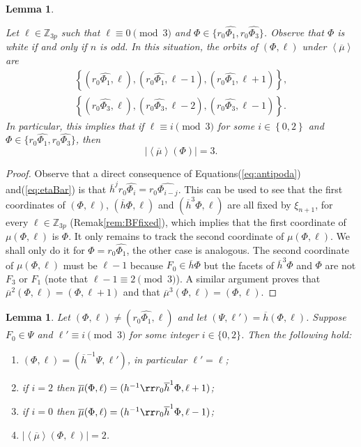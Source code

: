 \documentclass[final]{amsart}
\theoremstyle{plain}
\newtheorem{lemma}[thm]{Lemma}
\theoremstyle{definition}
\theoremstyle{remark}
\numberwithin{equation}{section}
\renewcommand{\{}{\lbrace}
\renewcommand{\}}{\rbrace}
\renewcommand{\bar}{\overline}
\renewcommand{\hat}{\widehat}
\newcommand{\bZ}{\mathbb{Z}}
\newcommand{\kng}{{h}}
\newcommand{\etab}{\bar{\kng}}
\newcommand{\mub}{\bar{\mu}}
\newcommand{\te}{\xi}
\begin{document}
\begin{lemma}\label{lem:chapulines0}


Let $\ell \in \bZ_{3p}$ such that $\ell \equiv 0 \pmod{3}$ and $\Phi \in \{r_{0}\hat{\Phi_{1}}, r_{0}\hat{\Phi_{3}} \}$. Observe that $\Phi$ is white if and only if $n$ is odd.
In this situation, the orbits of $(\Phi,\ell)$ under $\left\langle \mub \right\rangle $ are
\[
\begin{gathered}
\left\{ (r_{0}\hat{\Phi_{1}},\ell), (r_{0}\hat{\Phi_{1}},\ell-1), (r_{0}\hat{\Phi_{1}},\ell+1) \right\}, \\
\left\{ (r_{0}\hat{\Phi_{3}},\ell), (r_{0}\hat{\Phi_{3}},\ell-2), (r_{0}\hat{\Phi_{3}},\ell-1) \right\}.
\end{gathered}
\]
In particular, this implies that if  $\ell \equiv i \pmod{3}$ for some $i \in \left\{ 0,2 \right\} $ and $\Phi \in \{r_{0}\hat{\Phi_{1}},r_{0}\hat{\Phi_{3}}\}  $, then
\[
	\left| \left\langle \mub \right\rangle \left( \Phi \right) \right| = 3.
\]
\end{lemma}

\begin{proof}
  Observe that a direct consequence of Equations\nobreakspace \textup {(\ref {eq:antipoda})} and\nobreakspace  \textup {(\ref {eq:etaBar})} is that $\etab^{j} r_{0}\hat{\Phi_{i}} = r_{0}\hat{\Phi_{i-j}}$.
  This can be used to see that the first coordinates of $(\Phi,\ell)$, $(\etab \Phi,\ell)$ and $(\etab^3 \Phi,\ell)$ are all fixed by $\te_{n+1}$, for every $\ell \in \bZ_{3p}$ (Remak\nobreakspace \ref {rem:BFfixed}), which implies that the first coordinate of $\mu(\Phi,\ell)$ is $\Phi$.
  It only remains to track the second coordinate of $\mu(\Phi,\ell)$. 
  We shall only do it for $\Phi = r_{0} \hat{\Phi_1}$, the other case is analogous.
  The second coordinate of $\mu(\Phi,\ell)$ must be $\ell -1$ because $F_{0} \in \etab \Phi$  but the facets of $\etab^{3} \Phi$ and $\Phi$ are not $F_3$ or $F_1$ (note that $\ell-1 \equiv 2 \pmod{3}$).
  A similar argument proves that $\mub^{2}(\Phi, \ell) = (\Phi, \ell + 1)$ and that $\mub^{3}(\Phi,\ell) = (\Phi,\ell)$.
\end{proof}




\begin{lemma}
\label{lem:chapulines1}
Let $(\Phi,\ell) \neq (r_0 \hat{\Phi_1},\ell)$ and let $(\Psi,\ell') =  \etab (\Phi,\ell)$.
Suppose $F_0 \in \Psi$ and $\ell' \equiv i \pmod 3$ for some integer $i\in \{0,2\}$.
Then the following hold:
\begin{enumerate}
    \item \label{item:chapulines11} $(\Phi,\ell) = (\etab^{-1} \Psi, \ell')$, in particular $\ell' = \ell$;
    \item \label{item:chapulines12} if $i = 2$ then $\mub(\Phi,\ell) = (\kng^{-1} \rr r_0 \etab^1 \Phi,\ell+1)$;
    \item \label{item:chapulines13} if $i = 0$ then $\mub(\Phi,\ell) = (\kng^{-1} \rr r_0 \etab^1 \Phi,\ell-1)$;
    \item \label{item:chapulines14}$ |\left\langle \mub \right\rangle (\Phi,\ell)| = 2$.
\end{enumerate}
\end{lemma}
\end{document}
